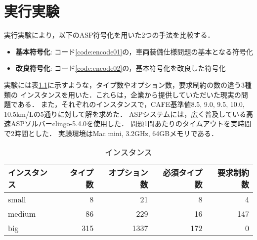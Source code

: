 \chapter{実行実験}

\newenvironment{tableA}{%
  \tabcolsep = 3mm
  \begin{tabular}[t]{lrr}\hline
    インスタンス & 符号化1 & 符号化2\\\hline
    }{%
    \hline
  \end{tabular}
}
\newenvironment{tableB}{%
  \begin{tabular}[t]{lrrr}\hline
    インスタンス & 基準値 & 基本符号化 & 改良符号化 \\\hline
    }{%
    \hline
  \end{tabular}
}

実行実験により，以下のASP符号化を用いた2つの手法を比較する．
\begin{itemize}
	\item \textbf{基本符号化}: コード\ref{code:encode01}の，車両装備仕様問題の基本となる符号化
	\item \textbf{改良符号化}: コード\ref{code:encode02}の，基本符号化を改良した符号化
\end{itemize}

実験には表\ref{tab:instance}に示すような，タイプ数やオプション数，要求制約の数の違う3種類の
インスタンスを用いた．これらは，企業から提供していただいた現実の問題である．
また，それぞれのインスタンスで，CAFE基準値8.5, 9.0, 9.5, 10.0, 10.5km/Lの5通りに対して解を求めた．
ASPシステムには，広く普及している高速ASPソルバーclingo-5.4.0を使用した．
問題1問あたりのタイムアウトを実時間で2時間とした．
実験環境はMac mini, 3.2GHz, 64GBメモリである．

\begin{table}[htbp]
	\caption{インスタンス}
	\label{tab:instance}
	\centering
	\begin{tabular}{lrrrr}\\\hline
	インスタンス	&	タイプ数	&	オプション数	&	必須タイプ数	&	要求制約数	\\\hline
	small				&	8				&	21					&	8						&	4					\\
	medium			&	86			&	229					&	16					&	147				\\
	big					&	315			&	1337				&	172					&	0					\\\hline
	\end{tabular}
\end{table}


